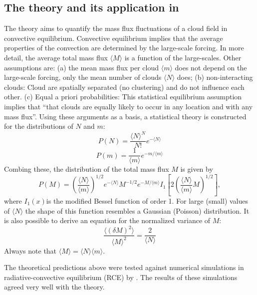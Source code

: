 \documentclass[a4paper, 12pt]{article}
\begin{document}
\subsection{The \cite{Craig2006} theory and its application in \cite{Plant2008}} 
The \cite[][CC06]{Craig2006} theory aims to quantify the mass flux fluctuations of a cloud field in convective equilibrium. Convective equilibrium implies that the average properties of the convection are determined by the large-scale forcing. In more detail, the average total mass flux $\langle M \rangle$ is a function of the large-scales. Other assumptions are: (a) the mean mass flux per cloud $\langle m \rangle$ does not depend on the large-scale forcing, only the mean number of clouds $\langle N \rangle$ does; (b) non-interacting clouds: Cloud are spatially separated (no clustering) and do not influence each other. (c) Equal a priori probabilities: This statistical equilibrium assumption implies that ``that clouds are equally likely to occur in any location and with any mass flux''. Using these arguments as a basis, a statistical theory is constructed for the distributions of $N$ and $m$:
\begin{equation} \label{N_dist}
 P(N) = \frac{\langle N \rangle^N}{N!}e^{-\langle N \rangle}
\end{equation}
\begin{equation} \label{m_dist}
 P(m) = \frac{1}{\langle m \rangle}e^{-m/\langle m \rangle}
\end{equation}
Combing these, the distribution of the total mass flux $M$ is given by
\begin{equation} \label{M_dist}
 P(M) = \left( \frac{\langle N \rangle}{\langle m \rangle} \right)^{1/2} e^{-\langle N \rangle} M^{-1/2} e^{-M/\langle m \rangle} I_1\left[ 2 \left( \frac{\langle N \rangle}{\langle m \rangle} M \right)^{1/2} \right],
\end{equation}
where $I_1(x)$is the modified Bessel function of order 1. For large (small) values of $\langle N \rangle$ the shape of this function resembles a Gaussian (Poisson) distribution.   
It is also possible to derive an equation for the normalized variance of $M$:
\begin{equation} \label{M_var}
 \frac{\langle (\delta M)^2 \rangle}{\langle M \rangle^2} = \frac{2}{\langle N \rangle}
\end{equation}
Always note that $\langle M \rangle = \langle N \rangle \langle m \rangle$.

The theoretical predictions above were tested against numerical simulations in radiative-convective equilibrium (RCE) by \cite{Cohen2006}. The results of these simulations agreed very well with the theory.
\end{document}
